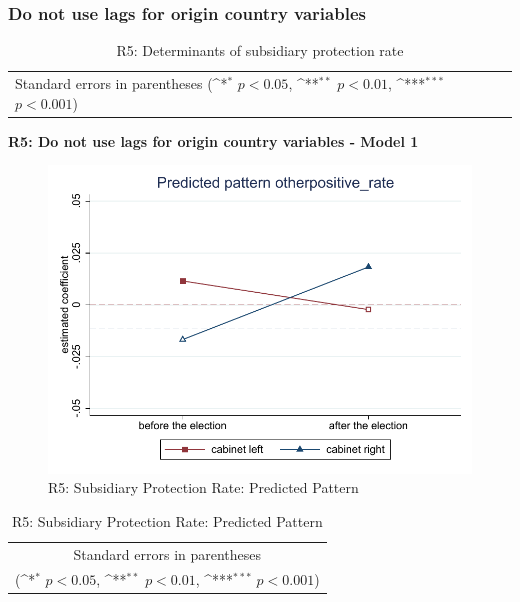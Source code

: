 \documentclass[10pt,a4paper]{scrartcl}
\begin{document}



\clearpage
\FloatBarrier
\subsubsection{Do not use lags for origin country variables}
\begin{table}[!ht]\centering
	\renewcommand{\arraystretch}{1.25}
	\small
	\def\sym#1{\ifmmode^{#1}\else\(^{#1}\)\fi}
	\caption{R5: Determinants of subsidiary protection rate}
	\begin{tabular}{l*{3}{c}}
		\hline\hline
		
		\hline\hline
		\multicolumn{4}{l}{\footnotesize Standard errors in parentheses (\sym{*} \(p<0.05\), \sym{**} \(p<0.01\), \sym{***} \(p<0.001\))}\\
	\end{tabular}
\end{table}

\clearpage
\textbf{R5: Do not use lags for origin country variables - Model 1}
\begin{figure}[!ht]
	\centering
	\includegraphics[width=1\textwidth]{figures_edited/otherpositive_rate_graph1_R5.pdf}
	\caption{R5: Subsidiary Protection Rate: Predicted Pattern}
\end{figure}

\begin{table}[!ht]\centering
	\renewcommand{\arraystretch}{1.25}
	\def\sym#1{\ifmmode^{#1}\else\(^{#1}\)\fi}
	\caption{R5: Subsidiary Protection Rate: Predicted Pattern}
	\begin{tabular}{l*{2}{c}}
		\hline\hline
		
		\hline\hline
		\multicolumn{3}{c}{\footnotesize Standard errors in parentheses} \\
		\multicolumn{3}{c}{\footnotesize (\sym{*} \(p<0.05\), \sym{**} \(p<0.01\), \sym{***} \(p<0.001\))}\\
	\end{tabular}
\end{table}
\end{document}
